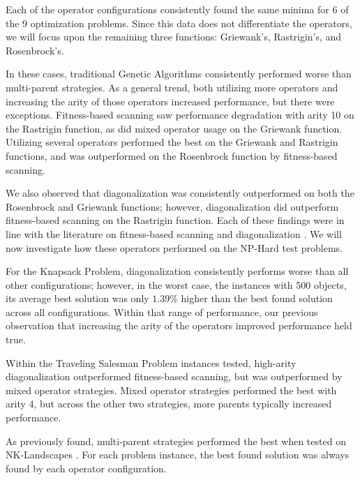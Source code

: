 %
%

Each of the operator configurations consistently found the same minima for 6 of the 9 optimization problems. Since this data does not differentiate the operators, we will focus upon the remaining three functions: Griewank's, Rastrigin's, and Rosenbrock's. 

In these cases, traditional Genetic Algorithms consistently performed worse than multi-parent strategies. As a general trend, both utilizing more operators and increasing the arity of those operators increased performance, but there were exceptions. Fitness-based scanning saw performance degradation with arity 10 on the Rastrigin function, as did mixed operator usage on the Griewank function. Utilizing several operators performed the best on the Griewank and Rastrigin functions, and was outperformed on the Rosenbrock function by fitness-based scanning.

We also observed that diagonalization was consistently outperformed on both the Rosenbrock and Griewank functions; however, diagonalization did outperform fitness-based scanning on the Rastrigin function. Each of these findings were in line with the literature on fitness-based scanning and diagonalization \cite{Eiben94, Eiben95}. We will now investigate how these operators performed on the NP-Hard test problems.

%
%

For the Knapsack Problem, diagonalization consistently performs worse than all other configurations; however, in the worst case, the instances with 500 objects, its average best solution was only $1.39\%$ higher than the best found solution across all configurations. Within that range of performance, our previous observation that increasing the arity of the operators improved performance held true.

%
%

Within the Traveling Salesman Problem instances tested, high-arity diagonalization outperformed fitness-based scanning, but was outperformed by mixed operator strategies. Mixed operator strategies performed the best with arity 4, but across the other two strategies, more parents typically increased performance.

As previously found, multi-parent strategies performed the best when tested on NK-Landscapes \cite{Eiben96}. For each problem instance, the best found solution was always found by each operator configuration.


